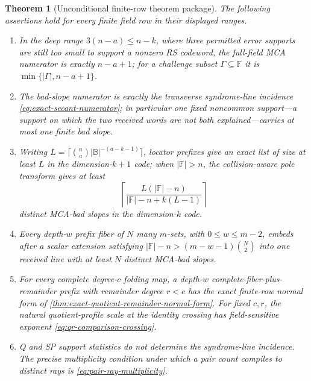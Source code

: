 \documentclass[12pt,a4paper]{amsart}
\numberwithin{equation}{section}
\newtheorem{theorem}{Theorem}[section]
\theoremstyle{remark}
\newcommand{\F}{\mathbb F}
\newcommand{\B}{\mathbb B}
\newcommand{\abs}[1]{\lvert #1\rvert}
\begin{document}
\begin{theorem}[Unconditional finite-row theorem package]
\label{thm:main-unconditional}
The following assertions hold for every finite field row in their displayed
ranges.
\begin{enumerate}[label=\textup{(\roman*)},leftmargin=*]
\item In the \emph{deep range} \(3(n-a)\le n-k\), where three permitted
      error supports are still too small to support a nonzero RS codeword,
      the full-field MCA numerator is
      exactly \(n-a+1\); for a challenge subset \(\Gamma\subseteq\F\) it is
      \(\min\{\abs\Gamma,n-a+1\}\).
\item The bad-slope numerator is exactly the transverse syndrome-line
      incidence \eqref{eq:exact-secant-numerator}; in particular one fixed
      \emph{noncommon support}---a support on which the two received words
      are not both explained---carries at most one finite bad slope.
\item Writing
      \(L=\lceil\binom na\abs\B^{-(a-k-1)}\rceil\), locator prefixes give
      an exact list of size at least \(L\) in the dimension-\(k+1\)
      code; when \(\abs\F>n\), the collision-aware pole transform gives at least
      \[
      \left\lceil\frac{L(\abs\F-n)}{\abs\F-n+k(L-1)}\right\rceil
      \]
      distinct MCA-bad slopes in the dimension-\(k\) code.
\item Every depth-\(w\) prefix fiber of \(N\) many \(m\)-sets, with
      \(0\le w\le m-2\), embeds after a scalar extension satisfying
      \(\abs\F-n>(m-w-1)\binom N2\) into one received line with at least
      \(N\) distinct MCA-bad slopes.
\item For every complete degree-\(c\) folding map, a depth-\(w\)
      complete-fiber-plus-remainder prefix with remainder degree \(r<c\)
      has the exact finite-row normal form of
      \cref{thm:exact-quotient-remainder-normal-form}.  For fixed \(c,r\),
      the natural quotient-profile scale at the identity crossing has
      field-sensitive exponent
      \eqref{eq:qr-comparison-crossing}.
\item Q and SP support statistics do not determine the syndrome-line
      incidence.  The precise multiplicity condition under which a pair
      count compiles to distinct rays is
      \eqref{eq:pair-ray-multiplicity}.
\end{enumerate}
\end{theorem}
\end{document}
